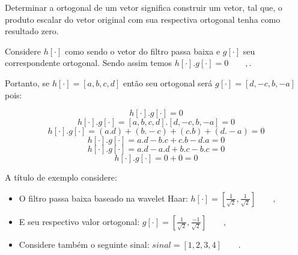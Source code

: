 			\par Determinar a ortogonal de um vetor significa construir um vetor, tal que, o produto escalar do vetor original com sua respectiva ortogonal tenha como resultado zero.
			
			\par Considere $h[\cdot]$ como sendo o vetor do filtro passa baixa e $g[\cdot]$ seu correspondente ortogonal. Sendo assim temos $h[\cdot] . g[\cdot] = 0\qquad,$.
			
			\par Portanto, se $h[\cdot]=[a, b, c, d]$ então seu ortogonal será $g[\cdot]=[d, -c, b, -a]$ pois:
			
			\begin{equation}
				h[\cdot] . g[\cdot]  = 0
			\end{equation}
			\begin{equation}
				h[\cdot] . g[\cdot]  = [a, b, c, d] . [d, -c, b, -a] = 0
			\end{equation}
			\begin{equation}
				h[\cdot] . g[\cdot]  = (a.d) + (b.-c) + (c.b) + (d.-a) = 0
			\end{equation}
			\begin{equation}
				h[\cdot] . g[\cdot]  = a.d - b.c + c.b - d.a = 0
			\end{equation}
			\begin{equation}
				h[\cdot] . g[\cdot]  = a.d - a.d + b.c - b.c = 0
			\end{equation}
			\begin{equation}
				h[\cdot] . g[\cdot]  = 0 + 0 = 0
			\end{equation}

			\par A título de exemplo considere:
			\begin{itemize}
				\item O filtro passa baixa baseado na wavelet Haar: $h[\cdot] = [\frac{1}{\sqrt{2}}, \frac{1}{\sqrt{2}}]\qquad,$
				\item E seu respectivo valor ortogonal: $g[\cdot] = [\frac{1}{\sqrt{2}}, \frac{-1}{\sqrt{2}}]\qquad,$
				\item Considere também o seguinte sinal:	$sinal = [1,2,3,4]\qquad.$
			\end{itemize}

